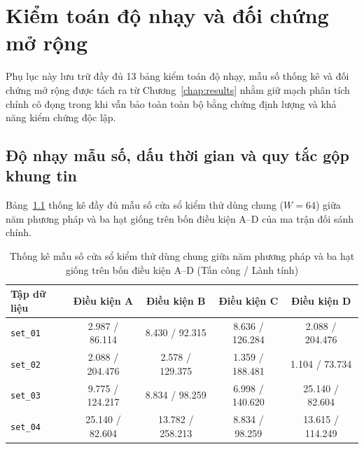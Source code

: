 \documentclass[12pt, a4paper, reqno, oneside]{book}
\DeclareRobustCommand{\code}[1]{\nolinkurl{#1}}
\begin{document}
\chapter{Kiểm toán độ nhạy và đối chứng mở rộng}\label{app:sensitivity}
Phụ lục này lưu trữ đầy đủ 13 bảng kiểm toán độ nhạy, mẫu số thống kê và đối chứng mở rộng được tách ra từ Chương~\ref{chap:results} nhằm giữ mạch phân tích chính cô đọng trong khi vẫn bảo toàn toàn bộ bằng chứng định lượng và khả năng kiểm chứng độc lập.

\section{Độ nhạy mẫu số, dấu thời gian và quy tắc gộp khung tin}
Bảng~\ref{tab:comparison-counts} thống kê đầy đủ mẫu số cửa sổ kiểm thử dùng chung ($W=64$) giữa năm phương pháp và ba hạt giống trên bốn điều kiện A--D của ma trận đối sánh chính.

\begin{table}[htbp]
\centering
\small
\caption{Thống kê mẫu số cửa sổ kiểm thử dùng chung giữa năm phương pháp và ba hạt giống trên bốn điều kiện A--D (Tấn công / Lành tính)}\label{tab:comparison-counts}
\vspace{2pt}
\begin{tabular}{lcccc}
\toprule
\textbf{Tập dữ liệu} & \textbf{Điều kiện A} & \textbf{Điều kiện B} & \textbf{Điều kiện C} & \textbf{Điều kiện D} \\
\midrule
\code{set\_01} & 2.987 / 86.114 & 8.430 / 92.315 & 8.636 / 126.284 & 2.088 / 204.476 \\
\code{set\_02} & 2.088 / 204.476 & 2.578 / 129.375 & 1.359 / 188.481 & 1.104 / 73.734 \\
\code{set\_03} & 9.775 / 124.217 & 8.834 / 98.259 & 6.998 / 140.620 & 25.140 / 82.604 \\
\code{set\_04} & 25.140 / 82.604 & 13.782 / 258.213 & 8.834 / 98.259 & 13.615 / 114.249 \\
\bottomrule
\end{tabular}
\end{table}
\end{document}
